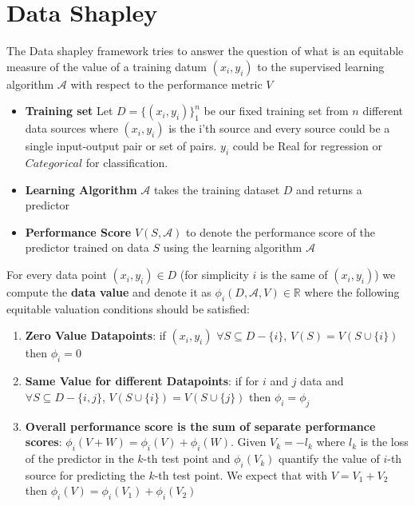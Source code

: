 \documentclass[pdflatex,sn-mathphys-num]{sn-jnl}
\begin{document}
\section{Data Shapley}

The Data shapley framework tries to answer the question of what is an equitable measure of the value of a training datum $(x_i,y_i)$ to the supervised learning algorithm $\mathscr{A}$ with respect to the performance metric $V$

\begin{itemize}
    \item \textbf{Training set} Let $D = \{(x_i,y_i)\}^n_1$ be our fixed training set from $n$ different data sources where $(x_i, y_i)$ is the i'th source and every source could be a single input-output pair or set of pairs. $y_i$ could be Real for regression or $Categorical$ for classification.
    \item \textbf{Learning Algorithm} $\mathscr{A}$ takes the training dataset $D$ and returns a predictor
    \item \textbf{Performance Score} $V(S,\mathscr{A})$ to denote the performance score of the predictor trained on data $S$ using the learning algorithm $\mathscr{A}$
\end{itemize}

For every data point $(x_i,y_i) \in D$ (for simplicity $i$ is the same of $(x_i,y_i)$) we compute the \textbf{data value} and denote it as $\phi_i(D,\mathscr{A},V) \in \mathbb{R}$
where the following equitable valuation conditions \cite{ghorbani2019data} should be satisfied:

\begin{enumerate}
    \item \textbf{Zero Value Datapoints}: if $(x_i,y_i)$ $\forall S \subseteq D -\{i\}$, $V(S) = V(S \cup \{i\})$ then $\phi_i = 0$
    \item \textbf{Same Value for different Datapoints}: if for $i$ and $j$ data and $\forall S \subseteq D - \{i,j\}$, $V(S \cup \{i\}) = V(S \cup \{j\})$ then $\phi_i = \phi_j$
    \item \textbf{Overall performance score is the sum of separate performance scores}: $\phi_i (V + W) = \phi_i(V) + \phi_i(W)$. Given $V_k = -l_k$ where $l_k$ is the loss of the predictor in the $k$-th test point and $\phi_i(V_k)$ quantify the value of $i$-th source for predicting the $k$-th test point. We expect that with $V = V_1 + V_2$ then $\phi_i({V}) = \phi_i({V_1}) + \phi_i({V_2})$
\end{enumerate}
\end{document}
